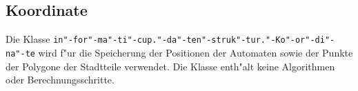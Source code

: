 \subsection{Koordinate}
Die Klasse \texttt{in"-for"-ma"-ti"-cup."-da"-ten"-struk"-tur."-Ko"-or"-di"-na"-te} wird f"ur die Speicherung der Positionen der Automaten sowie der Punkte der Polygone der Stadtteile verwendet. Die Klasse enth"alt keine Algorithmen oder Berechnungsschritte. 

